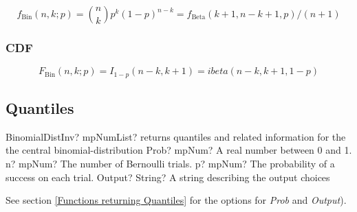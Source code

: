 \begin{equation} 
	f_{\text{Bin}}(n, k; p) = \binom{n}{k} p^k (1-p)^{n-k} = f_{\text{Beta}}(k+1,n-k+1,p)/(n+1)
\end{equation}


\subsubsection{CDF}
\label{BinomialDistributionCDF}
\begin{equation} 
	F_{\text{Bin}}(n, k; p) = I_{1-p}(n-k,k+1) = ibeta(n-k,k+1,1-p)
\end{equation}



\subsection{Quantiles}


\begin{mpFunctionsExtract}
	\mpFunctionFour
	{BinomialDistInv? mpNumList? returns quantiles and related information for the the central binomial-distribution}
	{Prob? mpNum? A real number between 0 and 1.}
	{n? mpNum? The number of Bernoulli trials.}
	{p? mpNum? The probability of a success on each trial.}
	{Output? String? A string describing the output choices}
\end{mpFunctionsExtract}

\vspace{0.3cm}
See section \ref{Functions returning Quantiles} for the options for  {\itshape\sffamily Prob} and {\itshape\sffamily Output}). 

%
%
%




